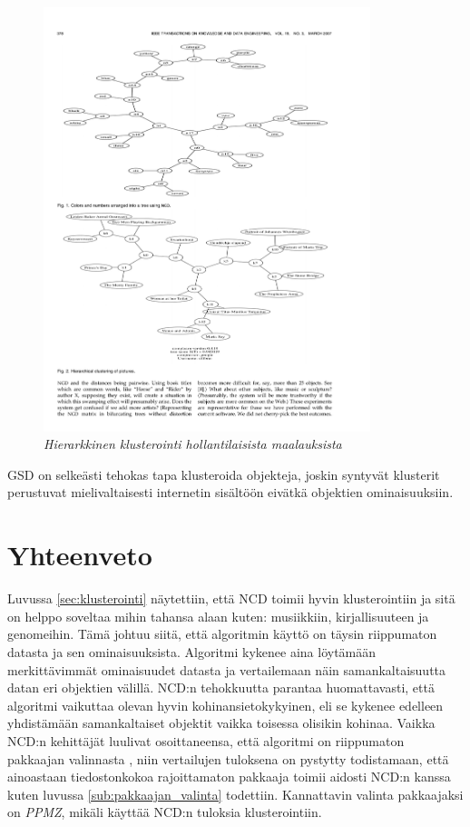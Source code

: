 \documentclass[12pt,finnish,final]{tktltiki2}
\theoremstyle{definition}
\theoremstyle{remark}
\begin{document}
      \begin{figure}[tb]
        \immediate{}
        \includegraphics[width=\textwidth, height=350pt]{img/dutch-paintings}
        \caption{\emph{Hierarkkinen klusterointi hollantilaisista maalauksista} \cite{cilibrasi2007google} }
        \label{fig:dutch-paintings}
      \end{figure}

      GSD on selkeästi \cite{cilibrasi2007google} tehokas tapa klusteroida objekteja, joskin syntyvät klusterit perustuvat mielivaltaisesti internetin sisältöön eivätkä objektien ominaisuuksiin.




\section{Yhteenveto} %
\label{sec:yhteenveto}

  Luvussa \ref{sec:klusterointi} näytettiin, että NCD toimii hyvin klusterointiin ja sitä on helppo soveltaa mihin tahansa alaan kuten: musiikkiin, kirjallisuuteen ja genomeihin. Tämä johtuu siitä, että algoritmin käyttö on täysin riippumaton datasta ja sen ominaisuuksista. Algoritmi kykenee aina löytämään merkittävimmät ominaisuudet datasta ja vertailemaan näin samankaltaisuutta datan eri objektien välillä.
  NCD:n tehokkuutta parantaa huomattavasti, että algoritmi vaikuttaa olevan hyvin kohinansietokykyinen, eli se kykenee edelleen yhdistämään samankaltaiset objektit vaikka toisessa olisikin kohinaa.
  Vaikka NCD:n kehittäjät luulivat osoittaneensa, että algoritmi on riippumaton pakkaajan valinnasta \cite{CV05}, niin vertailujen tuloksena on pystytty todistamaan, että ainoastaan tiedostonkokoa rajoittamaton pakkaaja toimii aidosti NCD:n kanssa kuten luvussa \ref{sub:pakkaajan_valinta} todettiin.
  Kannattavin valinta pakkaajaksi on \emph{PPMZ}, mikäli käyttää NCD:n tuloksia klusterointiin.
\end{document}
